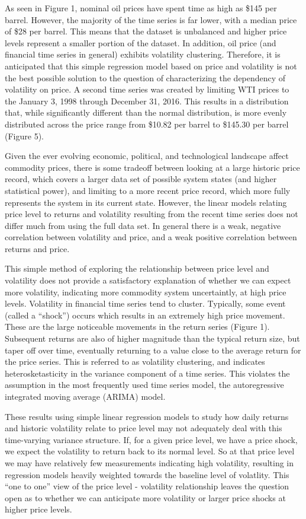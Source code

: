 \documentclass[]{article}
\begin{document}
As seen in Figure 1, nominal oil prices have spent time as high as \$145
per barrel. However, the majority of the time series is far lower, with
a median price of \$28 per barrel. This means that the dataset is
unbalanced and higher price levels represent a smaller portion of the
dataset. In addition, oil price (and financial time series in general)
exhibits volatility clustering. Therefore, it is anticipated that this
simple regression model based on price and volatility is not the best
possible solution to the question of characterizing the dependency of
volatility on price. A second time series was created by limiting WTI
prices to the January 3, 1998 through December 31, 2016. This results in
a distribution that, while significantly different than the normal
distribution, is more evenly distributed across the price range from
\$10.82 per barrel to \$145.30 per barrel (Figure 5).

Given the ever evolving economic, political, and technological landscape
affect commodity prices, there is some tradeoff between looking at a
large historic price record, which covers a larger data set of possible
system states (and higher statistical power), and limiting to a more
recent price record, which more fully represents the system in its
current state. However, the linear models relating price level to
returns and volatility resulting from the recent time series does not
differ much from using the full data set. In general there is a weak,
negative correlation between volatility and price, and a weak positive
correlation between returns and price.

This simple method of exploring the relationship between price level and
volatility does not provide a satisfactory explanation of whether we can
expect more volatility, indicating more commodity system uncertaintly,
at high price levels. Volatility in financial time series tend to
cluster. Typically, some event (called a ``shock'') occurs which results
in an extremely high price movement. These are the large noticeable
movements in the return series (Figure 1). Subsequent returns are also
of higher magnitude than the typical return size, but taper off over
time, eventually returning to a value close to the average return for
the price series. This is referred to as volatility clustering, and
indicates heterosketasticity in the variance component of a time series.
This violates the assumption in the most frequently used time series
model, the autoregressive integrated moving average (ARIMA) model.

These results using simple linear regression models to study how daily
returns and historic volatility relate to price level may not adequately
deal with this time-varying variance structure. If, for a given price
level, we have a price shock, we expect the volatility to return back to
its normal level. So at that price level we may have relatively few
measurements indicating high volatility, resulting in regression models
heavily weighted towards the baseline level of volatlity. This ``one to
one'' view of the price level - volatility relationship leaves the
question open as to whether we can anticipate more volatility or larger
price shocks at higher price levels.
\end{document}
